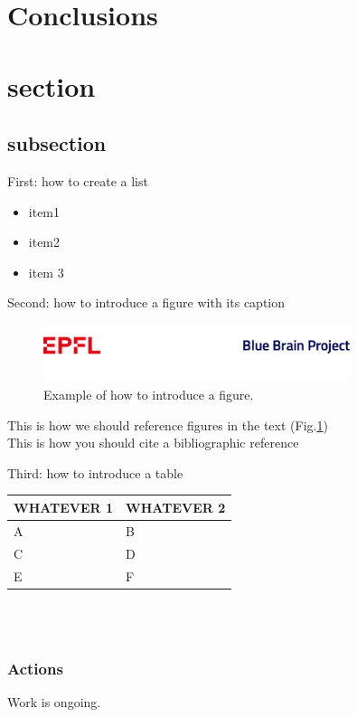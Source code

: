 
\section{Conclusions}

\section{section}

\subsection{subsection}

First: how to create a list
\begin{itemize}
\item item1
\item item2
\item item 3
\end{itemize}

Second: how to introduce a figure with its caption
\begin{figure}[h!]
\includegraphics[width=0.8\textwidth]{figs/Last.png}
\caption{Example of how to introduce a figure.}
\label{fig_test}
\end{figure}


This is how we should reference figures in the text (Fig.\ref{fig_test}) \\

This is how you should cite a bibliographic reference \citet{richardson2008measurement}

Third: how to introduce a table\\

\begin{tabular}{ | p{5cm} | p{5cm} |}\hline
WHATEVER 1 & WHATEVER 2 \\ \hline
A & B\\ \hline
C & D\\ \hline
E & F\\ \hline
\end{tabular}\\ \\


\subsubsection{Actions}
Work is ongoing.


{}
